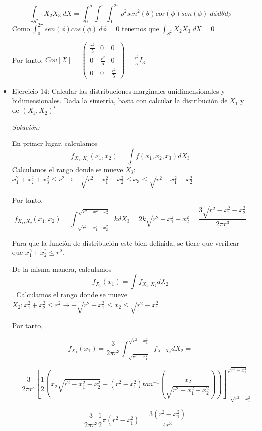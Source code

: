 \documentclass{article}
\theoremstyle{theorem-style}  %
\theoremstyle{definition}
\theoremstyle{example-style}
\begin{document}
\begin{itemize}
		$$\int_{S^2}X_2X_3\;dX = \int_{0}^{\rho} \int_{0}^{\pi} \int_{0}^{2\pi}\rho^2sen^2(\theta)cos(\phi)sen(\phi)\;d\phi d\theta d\rho$$
		Como $\displaystyle\int_{0}^{2\pi}sen(\phi)cos(\phi) \;d\phi = 0$ tenemos que $\displaystyle\int_{S^2}X_2X_3\;dX =0$
		
		Por tanto, $Cov[X] = \left( \begin{array}{ccc}
		\frac{r^2}{5} & 0 & 0 \\
		0 & \frac{r^2}{5} & 0 \\
		0 & 0 & \frac{r^2}{5}
		\end{array}\right) = \displaystyle\frac{r^2}{5}I_3$
		
		
		
		\item Ejercicio 14: Calcular las distribuciones marginales unidimensionales y bidimensionales. Dada la simetría, basta con calcular la distribución de $X_1$ y de $(X_1, X_2)^t$
		
		\textit{Solución:}
	
		
		En primer lugar, calculamos \[f_{X_1, X_2}(x_1, x_2) = \int f(x_1, x_2, x_3) dX_3\] Calculamos el rango donde se mueve $X_3$: $x_1^2 + x_2 ^2 + x_3 ^2 \leq r^2 \rightarrow - \sqrt{r^2 - x_1^2 - x_2^2} \leq x_3 \leq \sqrt{r^2 - x_1^2 - x_2^2}$.
		
		Por tanto, \[f_{X_1, X_2}(x_1, x_2) = \int_{-\sqrt{r^2-x_1^2-x_2^2}}^{\sqrt{r^2 - x_1^2 - x_2^2}} k dX_3 = 2 k \sqrt{r^2 - x_1^2 - x_2^2} = \frac{3 \sqrt{r^2 - x_1^2 - x_2^2}}{2 \pi r^3}\]
		
		Para que la función de distribución esté bien definida, se tiene que verificar que $x_1 ^2 + x_2^2 \leq r^2$. 
		

		De la misma manera, calculamos \[f_{X_1}(x_1) = \int f_{X_1, X_2} dX_2\]. Calculamos el rango donde se mueve $X_2: x_1^2 + x_2^2 \leq r^2 \rightarrow - \sqrt{r^2 - x_1^2} \leq x_2 \leq  \sqrt{r^2 - x_1^2}$.
		
		Por tanto,
		
		\[
		f_{X_1}(x_1) = \frac{3}{2 \pi r^3} \int_{- \sqrt{r^2 - x_1^2} }^{\sqrt{r^2 - x_1^2}} f_{X_1, X_2} dX_2 =
		\]
		
		\[  = \frac{3}{2 \pi r^3} \left[\frac{1}{2} \left( x_2 \sqrt{ r^2 - x_1^2 - x_2 ^2 } + (r^2 - x_1 ^2) tan ^{-1} \left( \frac{x_2}{\sqrt{r^2 - x_1 ^2 - x_2^2}}\right)   \right) \right]_{- \sqrt{r^2 - x_1^2} } ^{\sqrt{r^2 - x_1^2}} =
		\]
		
		\[
		=\frac{3}{2 \pi r^3} \frac{1}{2} \pi (r^2 - x_1^2) =  \frac{3 (r^2 - x_1^2)}{4 r^3}
		\] 
		

\end{itemize}
\end{document}
